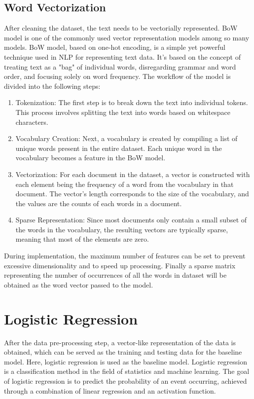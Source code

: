 \documentclass[ %
                    author={Bocheng Wang},
                supervisor={Dr. Qiang Liu},
                    degree={MSc},
                     title={A Research on Identification of Suicide Ideation in Texts with Multiple Models},
                      type={},
                      year={2024}]{dissertation}
\begin{document}
\subsection{Word Vectorization}
\noindent
After cleaning the dataset, the text needs to be vectorially represented. BoW model is one of the commonly used vector representation models among so many models. BoW model, based on one-hot encoding\cite{chren1998one}, is a simple yet powerful technique used in NLP for representing text data. It's based on the concept of treating text as a "bag" of individual words, disregarding grammar and word order, and focusing solely on word frequency. The workflow of the model is divided into the following steps:

\begin{enumerate}
      \item Tokenization: The first step is to break down the text into individual tokens. This process involves splitting the text into words based on whitespace characters.
      \item Vocabulary Creation: Next, a vocabulary is created by compiling a list of unique words present in the entire dataset. Each unique word in the vocabulary becomes a feature in the BoW model.
      \item Vectorization: For each document in the dataset, a vector is constructed with each element being the frequency of a word from the vocabulary in that document. The vector's length corresponds to the size of the vocabulary, and the values are the counts of each words in a document.
      \item Sparse Representation: Since most documents only contain a small subset of the words in the vocabulary, the resulting vectors are typically sparse, meaning that most of the elements are zero.
\end{enumerate}

During implementation, the maximum number of features can be set to prevent excessive dimensionality and to speed up processing. Finally a sparse matrix representing the number of occurrences of all the words in dataset will be obtained as the word vector passed to the model.

\section{Logistic Regression}
\noindent
After the data pre-processing step, a vector-like representation of the data is obtained, which can be served as the training and testing data for the baseline model. Here, logistic regression is used as the baseline model. Logistic regression is a classification method in the field of statistics and machine learning. The goal of logistic regression is to predict the probability of an event occurring, achieved through a combination of linear regression and an activation function.
\end{document}
